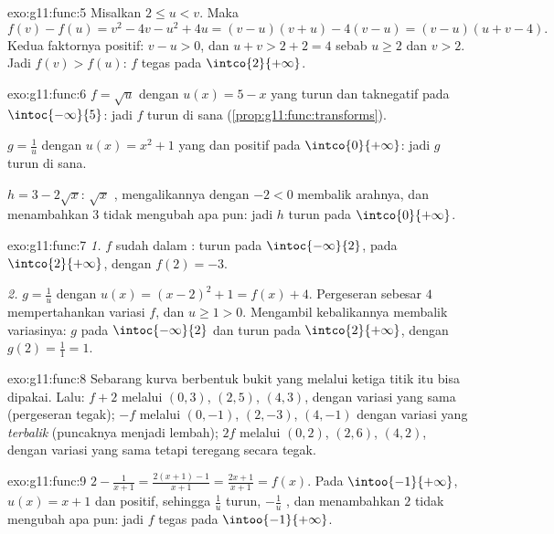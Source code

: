 \begin{solution}{exo:g11:func:5}
Misalkan $2 \leq u < v$. Maka
\[
f(v) - f(u) = v^2 - 4v - u^2 + 4u = (v-u)(v+u) - 4(v-u)
= (v - u)(u + v - 4).
\]
Kedua faktornya positif: $v - u > 0$, dan $u + v > 2 + 2 = 4$ sebab
$u \geq 2$ dan $v > 2$. Jadi $f(v) > f(u)$: $f$ tegas 
pada $\intco{2}{+\infty}$.
\end{solution}

\begin{solution}{exo:g11:func:6}
$f = \sqrt{u}$ dengan $u(x) = 5 - x$ yang turun dan taknegatif pada
$\intoc{-\infty}{5}$: jadi $f$ turun di sana
(\cref{prop:g11:func:transforms}).

$g = \frac1u$ dengan $u(x) = x^2 + 1$ yang  dan positif pada
$\intco{0}{+\infty}$: jadi $g$ turun di sana.

$h = 3 - 2\sqrt x$: $\sqrt x$ , mengalikannya dengan $-2 < 0$
membalik arahnya, dan menambahkan $3$ tidak mengubah apa pun: jadi $h$ turun
pada $\intco{0}{+\infty}$.
\end{solution}

\begin{solution}{exo:g11:func:7}
\emph{1.} $f$ sudah dalam : turun pada $\intoc{-\infty}{2}$,
 pada $\intco{2}{+\infty}$, dengan  $f(2) = -3$.

\emph{2.} $g = \frac{1}{u}$ dengan $u(x) = (x-2)^2 + 1 = f(x) + 4$.
Pergeseran sebesar $4$ mempertahankan variasi $f$, dan $u \geq 1 > 0$.
Mengambil kebalikannya membalik variasinya: $g$  pada
$\intoc{-\infty}{2}$ dan turun pada $\intco{2}{+\infty}$, dengan 
$g(2) = \frac{1}{1} = 1$.
\end{solution}

\begin{solution}{exo:g11:func:8}
Sebarang kurva berbentuk bukit yang melalui ketiga titik itu bisa dipakai. Lalu:
$f + 2$ melalui $(0,3)$, $(2,5)$, $(4,3)$, dengan variasi yang sama
(pergeseran tegak); $-f$ melalui $(0,-1)$, $(2,-3)$, $(4,-1)$ dengan
variasi yang \emph{terbalik} (puncaknya menjadi lembah); $2f$ melalui
$(0,2)$, $(2,6)$, $(4,2)$, dengan variasi yang sama tetapi teregang
secara tegak.
\end{solution}

\begin{solution}{exo:g11:func:9}
$2 - \frac{1}{x+1} = \frac{2(x+1) - 1}{x+1} = \frac{2x+1}{x+1} = f(x)$.
Pada $\intoo{-1}{+\infty}$, $u(x) = x + 1$  dan positif, sehingga
$\frac1u$ turun, $-\frac1u$ , dan menambahkan $2$ tidak mengubah
apa pun: jadi $f$ tegas  pada $\intoo{-1}{+\infty}$.
\end{solution}

